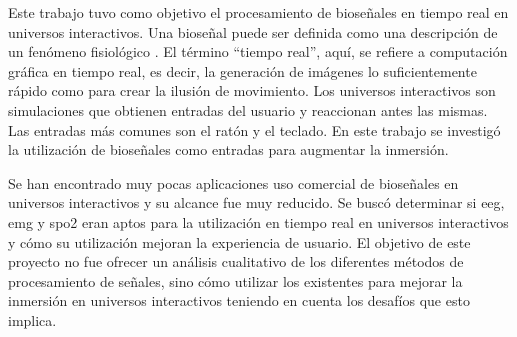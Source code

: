 Este trabajo tuvo como objetivo el procesamiento de bioseñales en tiempo real en universos interactivos. Una bioseñal puede ser definida como una descripción de un fenómeno fisiológico \cite{biosignal-book-2}.  El término ``tiempo real'', aquí, se refiere a computación gráfica en tiempo real, es decir, la generación de imágenes lo suficientemente rápido como para crear la ilusión de movimiento. Los universos interactivos son simulaciones que obtienen entradas del usuario y reaccionan antes las mismas. Las entradas más comunes son el ratón y el teclado. En este trabajo se investigó la utilización de bioseñales como entradas para augmentar la inmersión.

Se han encontrado muy pocas aplicaciones uso comercial de bioseñales en universos interactivos y su alcance fue muy reducido. Se buscó determinar si \acrshort{eeg}, \acrshort{emg} y \acrshort{spo2} eran aptos para la utilización en tiempo real en universos interactivos y cómo su utilización mejoran la experiencia de usuario. El objetivo de este proyecto no fue ofrecer un análisis cualitativo de los diferentes métodos de procesamiento de señales, sino cómo utilizar los existentes para mejorar la inmersión en universos interactivos teniendo en cuenta los desafíos que esto implica.